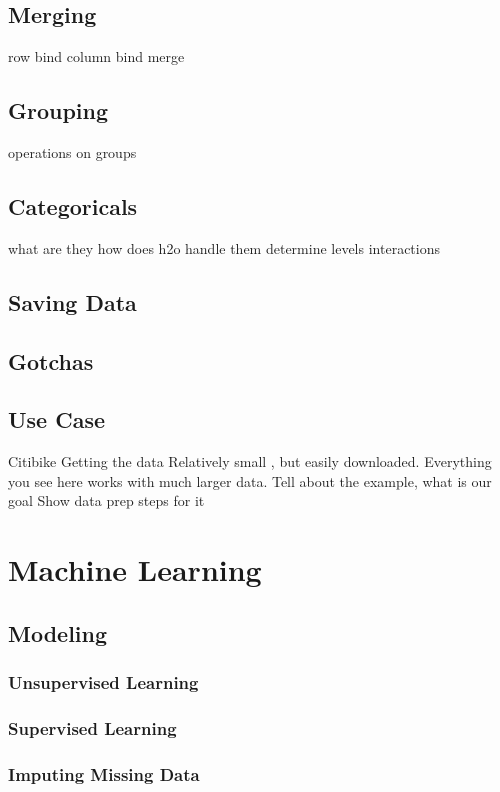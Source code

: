 \subsection{Merging}
row bind
column bind
merge

\subsection{Grouping}
operations on groups


\subsection{Categoricals}
what are they
how does h2o handle them
determine levels
interactions

\subsection{Saving Data}

\subsection{Gotchas}

\subsection{Use Case}
Citibike
Getting the data
Relatively small , but easily downloaded.  Everything you see here works with much larger data.
Tell about the example, what is our goal
Show data prep steps for it

\section{Machine Learning}

\subsection{Modeling}
\subsubsection{Unsupervised Learning}
\subsubsection{Supervised Learning}
\subsubsection{Imputing Missing Data}

